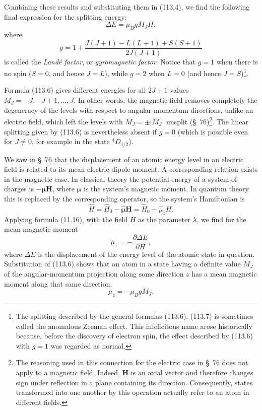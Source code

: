 Combining these results and substituting them in (113.4), we find the following final expression for the splitting energy:
\begin{equation}
 \Delta E=\mu_BgM_JH,
 \tag{113.6}
\end{equation}
where
\begin{equation}
 g=1+\frac{J(J+1)-L(L+1)+S(S+1)}{2J(J+1)}
 \tag{113.7}
\end{equation}
is called the \emph{Landé factor}, or \emph{gyromagnetic factor}. Notice that $g=1$ when there is no spin ($S=0$, and hence $J=L$), while $g=2$ when $L=0$ (and hence $J=S$)\footnote{The splitting described by the general formulas (113.6), (113.7) is sometimes called the anomalous Zeeman effect. This infelicitous name arose historically because, before the discovery of electron spin, the effect described by (113.6) with $g=1$ was regarded as normal.}.

Formula (113.6) gives different energies for all $2J+1$ values $M_J=-J,-J+1,\ldots,J$. In other words, the magnetic field removes completely the degeneracy of the levels with respect to angular-momentum directions, unlike an electric field, which left the levels with $M_J=\pm|M_J|$ unsplit (§~76)\footnote{The reasoning used in this connection for the electric case in §~76 does not apply to a magnetic field. Indeed, $\mathbf H$ is an axial vector and therefore changes sign under reflection in a plane containing its direction. Consequently, states transformed into one another by this operation actually refer to an atom in different fields.}. The linear splitting given by (113.6) is nevertheless absent if $g=0$ (which is possible even for $J\ne0$, for example in the state ${}^4D_{1/2}$).

We saw in §~76 that the displacement of an atomic energy level in an electric field is related to its mean electric dipole moment. A corresponding relation exists in the magnetic case. In classical theory the potential energy of a system of charges is $-\boldsymbol\mu\mathbf H$, where $\boldsymbol\mu$ is the system's magnetic moment. In quantum theory this is replaced by the corresponding operator, so the system's Hamiltonian is
\[
 \hat H=\hat H_0-\hat{\boldsymbol\mu}\mathbf H=\hat H_0-\hat\mu_zH.
\]
Applying formula (11.16), with the field $H$ as the parameter $\lambda$, we find for the mean magnetic moment
\begin{equation}
 \overline\mu_z=-\frac{\partial\Delta E}{\partial H},
 \tag{113.8}
\end{equation}
where $\Delta E$ is the displacement of the energy level of the atomic state in question. Substitution of (113.6) shows that an atom in a state having a definite value $M_J$ of the angular-momentum projection along some direction $z$ has a mean magnetic moment along that same direction:
\begin{equation}
 \overline\mu_z=-\mu_BgM_J.
 \tag{113.9}
\end{equation}

